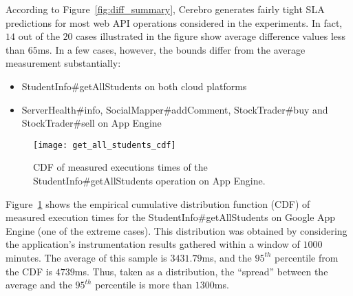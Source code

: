 According to Figure~\ref{fig:diff_summary}, Cerebro generates fairly tight 
SLA predictions for most web API operations considered in the experiments. In fact,
$14$ out of the $20$ cases illustrated in the figure show average difference
values less than $65$ms. In a few cases, however, the bounds differ from the
average measurement substantially:
\begin{itemize}
\vspace{-0.05in}
\item StudentInfo\#getAllStudents on both cloud platforms
\vspace{-0.05in}
\item ServerHealth\#info, SocialMapper\#addComment, StockTrader\#buy and StockTrader\#sell on App Engine
\vspace{-0.05in}
\end{itemize}


\begin{figure}
\centering
\texttt{[image: get\_all\_students\_cdf]}
\caption{CDF of measured executions times of the StudentInfo\#getAllStudents operation on App Engine.}
\label{fig:get_all_students_cdf}
\vspace{-0.2in}
\end{figure}

Figure~\ref{fig:get_all_students_cdf} shows the empirical cumulative
distribution function (CDF) of measured execution times for the 
StudentInfo\#getAllStudents on
Google App Engine (one of the extreme cases). 
This distribution was obtained by considering the application's instrumentation 
results gathered within a window of $1000$ minutes. 
The average of this sample is $3431.79$ms, and the $95^{th}$ percentile
from the CDF is $4739$ms.  Thus, taken as a distribution, the ``spread''
between the average and the $95^{th}$ percentile is more
than $1300$ms.  



